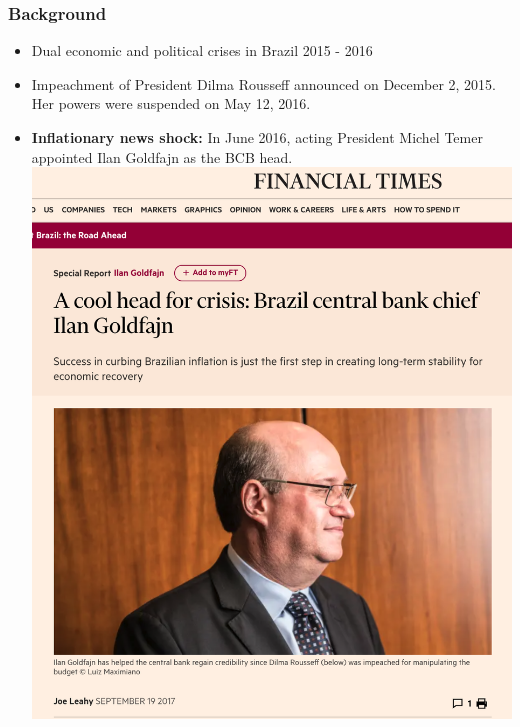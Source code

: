 \documentclass{beamer}
\begin{document}
\begin{frame}
\frametitle{Background}
	\begin{itemize}
		\item Dual economic and political crises in Brazil 2015 - 2016
		\item  Impeachment of President Dilma Rousseff announced on December 2, 2015. Her powers were suspended on May 12, 2016.
		\item \textbf{Inflationary news shock:} In June 2016, acting President Michel Temer appointed Ilan Goldfajn as the BCB head.
		\centering
		\includegraphics[scale=.2]{old_figures/goldfajn.png}
	\end{itemize}
\end{frame}
\end{document}

